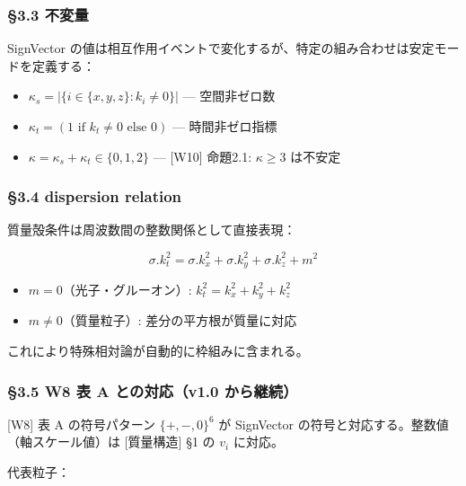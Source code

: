 \documentclass[a4paper,11pt]{ltjsarticle}
\providecommand{\tightlist}{\setlength{\itemsep}{0pt}\setlength{\parskip}{0pt}}
\begin{document}
\subsubsection{§3.3 不変量}\label{ux4e0dux5909ux91cf}

SignVector
の値は相互作用イベントで変化するが、特定の組み合わせは安定モードを定義する：

\begin{itemize}
\tightlist
\item
  \(\kappa_s = |\{i \in \{x,y,z\} : k_i \neq 0\}|\) --- 空間非ゼロ数
\item
  \(\kappa_t = (1 \text{ if } k_t \neq 0 \text{ else } 0)\) ---
  時間非ゼロ指標
\item
  \(\kappa = \kappa_s + \kappa_t \in \{0, 1, 2\}\) --- {[}W10{]}
  命題2.1: \(\kappa \geq 3\) は不安定
\end{itemize}

\subsubsection{§3.4 dispersion relation}\label{dispersion-relation}

質量殻条件は周波数間の整数関係として直接表現：

\[\sigma.k_t^2 = \sigma.k_x^2 + \sigma.k_y^2 + \sigma.k_z^2 + m^2\]

\begin{itemize}
\tightlist
\item
  \(m = 0\)（光子・グルーオン）: \(k_t^2 = k_x^2 + k_y^2 + k_z^2\)
\item
  \(m \neq 0\)（質量粒子）: 差分の平方根が質量に対応
\end{itemize}

これにより特殊相対論が自動的に枠組みに含まれる。

\subsubsection{§3.5 W8 表 A との対応（v1.0
から継続）}\label{w8-ux8868-a-ux3068ux306eux5bfeux5fdcv1.0-ux304bux3089ux7d99ux7d9a}

{[}W8{]} 表 A の符号パターン \(\{+, -, 0\}^6\) が SignVector
の符号と対応する。整数値（軸スケール値）は {[}質量構造{]} §1 の \(v_i\)
に対応。

代表粒子：
\end{document}
